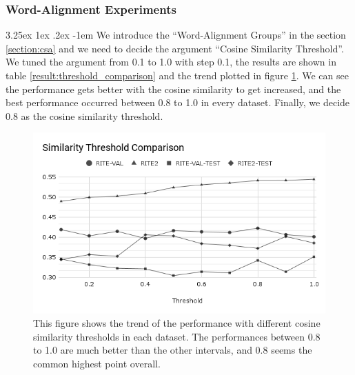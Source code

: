 \documentclass[12pt]{article}
\makeatletter
\renewcommand\paragraph{\@startsection{paragraph}{5}{\z@}%
  {3.25ex \@plus1ex \@minus.2ex}%
  {-1em}%
  {\normalfont\normalsize\bfseries}}
\makeatother
\begin{document}
\begin{CJK*}{UTF8}{bkai}
\begin{spacing}{1.77}
\subsubsection{Word-Alignment Experiments}
\paragraph{}
We introduce the ``Word-Alignment Groups'' in the section \ref{section:csa} and we need to decide the argument ``Cosine Similarity Threshold''. We tuned the argument from 0.1 to 1.0 with step 0.1, the results are shown in table \ref{result:threshold_comparison} and the trend plotted in figure \ref{fig:threshold}. We can see the performance gets better with the cosine similarity to get increased, and the best performance occurred between 0.8 to 1.0 in every dataset. Finally, we decide 0.8 as the cosine similarity threshold.

\begin{figure}[H]
  \centering
  \includegraphics[width=15cm]{SimThresholdComp.png}
  \caption[Cosine Similarity Threshold Comparison]{This figure shows the trend of the performance with different cosine similarity thresholds in each dataset. The performances between 0.8 to 1.0 are much better than the other intervals, and 0.8 seems the common highest point overall.}
  \label{fig:threshold}
\end{figure}


\end{spacing}
\end{CJK*}
\end{document}
